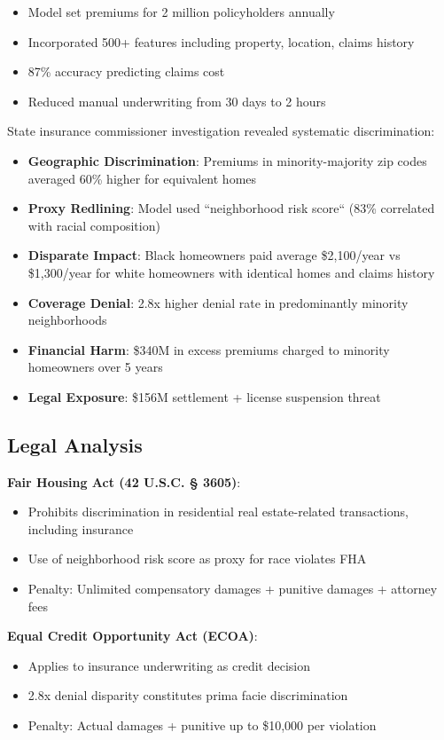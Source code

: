 \begin{itemize}
    \item Model set premiums for 2 million policyholders annually
    \item Incorporated 500+ features including property, location, claims history
    \item 87\% accuracy predicting claims cost
    \item Reduced manual underwriting from 30 days to 2 hours
\end{itemize}

State insurance commissioner investigation revealed systematic discrimination:
\begin{itemize}
    \item \textbf{Geographic Discrimination}: Premiums in minority-majority zip codes averaged 60\% higher for equivalent homes
    \item \textbf{Proxy Redlining}: Model used ``neighborhood risk score`` (83\% correlated with racial composition)
    \item \textbf{Disparate Impact}: Black homeowners paid average \$2,100/year vs \$1,300/year for white homeowners with identical homes and claims history
    \item \textbf{Coverage Denial}: 2.8x higher denial rate in predominantly minority neighborhoods
    \item \textbf{Financial Harm}: \$340M in excess premiums charged to minority homeowners over 5 years
    \item \textbf{Legal Exposure}: \$156M settlement + license suspension threat
\end{itemize}

\subsection{Legal Analysis}

\textbf{Fair Housing Act (42 U.S.C. § 3605)}:
\begin{itemize}
    \item Prohibits discrimination in residential real estate-related transactions, including insurance
    \item Use of neighborhood risk score as proxy for race violates FHA
    \item Penalty: Unlimited compensatory damages + punitive damages + attorney fees
\end{itemize}

\textbf{Equal Credit Opportunity Act (ECOA)}:
\begin{itemize}
    \item Applies to insurance underwriting as credit decision
    \item 2.8x denial disparity constitutes prima facie discrimination
    \item Penalty: Actual damages + punitive up to \$10,000 per violation
\end{itemize}

